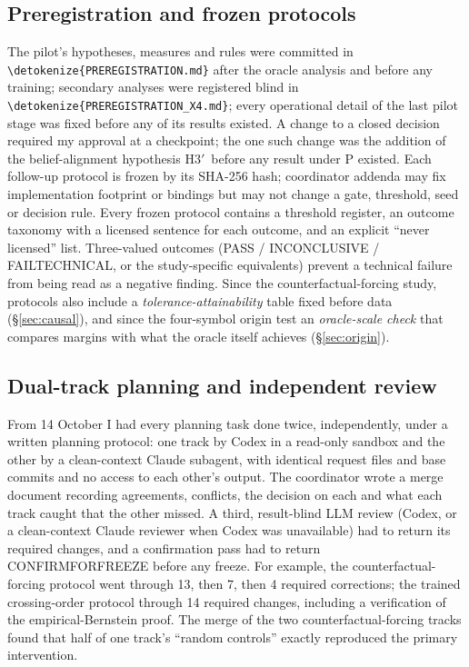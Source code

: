 \documentclass[11pt,a4paper]{article}
\DeclareRobustCommand{\_}{\ifmmode\origunderscore\else\textunderscore\allowbreak\fi}
\DeclareRobustCommand{\fpath}[1]{\begingroup\small\expandafter\nolinkurl\expandafter{\detokenize{#1}}\endgroup}
\newcommand{\Hp}{H3$'$}
\begin{document}
\subsection{Preregistration and frozen protocols}
The pilot's hypotheses, measures and rules were committed in \fpath{PREREGISTRATION.md} after
the oracle analysis and before any training; secondary analyses were registered blind in
\fpath{PREREGISTRATION_X4.md}; every operational detail of the last pilot stage was fixed before
any of its results existed. A change to a closed decision required my approval at a checkpoint;
the one such change was the addition of the belief-alignment hypothesis \Hp\ before any result
under P existed. Each follow-up protocol is frozen by its SHA-256 hash; coordinator addenda may
fix implementation footprint or bindings but may not change a gate, threshold, seed or decision
rule.
Every frozen protocol contains a threshold register, an outcome taxonomy with a licensed
sentence for each outcome, and an explicit ``never licensed'' list. Three-valued outcomes
(PASS / INCONCLUSIVE / FAIL\_TECHNICAL, or the study-specific equivalents) prevent a technical
failure from being read as a negative finding. Since the counterfactual-forcing study, protocols
also include a \emph{tolerance-attainability} table fixed before data (\S\ref{sec:causal}),
and since the four-symbol origin test an \emph{oracle-scale check} that compares margins with
what the oracle itself achieves (\S\ref{sec:origin}).

\subsection{Dual-track planning and independent review}
From 14 October I had every planning task done twice, independently, under a written planning
protocol: one track by Codex in a read-only sandbox and the other by a clean-context Claude
subagent, with identical request files and base commits and
no access to each other's output. The coordinator wrote a merge document recording agreements,
conflicts, the decision on each and what each track caught that the other missed. A third,
result-blind LLM review (Codex, or a clean-context Claude reviewer when Codex was unavailable) had to
return its required changes, and a confirmation pass had to return CONFIRM\_FOR\_FREEZE before
any freeze. For example, the counterfactual-forcing protocol went through 13, then 7, then 4
required corrections; the trained crossing-order protocol through 14 required changes, including
a verification of the empirical-Bernstein proof. The merge of the two counterfactual-forcing
tracks found that half of one track's ``random controls'' exactly reproduced the primary
intervention.
\end{document}
